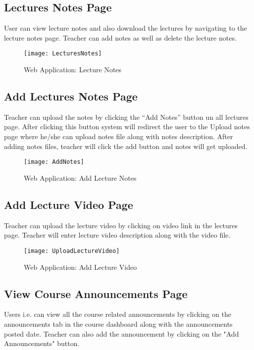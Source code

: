 \subsection{Lectures Notes Page}
User can view lecture notes and also download the lectures by navigating to the lecture notes page. Teacher can add notes as well as delete the lecture notes.

\begin{figure}[h]
  \centering
  \texttt{[image: LecturesNotes]}
  \caption{Web Application: Lecture Notes}
\end{figure}

\subsection{Add Lectures Notes Page}
Teacher can upload the notes by clicking the “Add Notes” button un all lectures page.  After clicking this button system will redirect the user to the Upload notes page where he/she can upload notes file along with notes description. After adding notes files,  teacher  will click the add button and notes will get uploaded.

\begin{figure}[h]
  \centering
  \texttt{[image: AddNotes]}
  \caption{Web Application: Add Lecture Notes}
\end{figure}

\subsection{Add Lecture Video Page}
Teacher can upload the lecture video by clicking on video link in the lectures page. Teacher will enter lecture video description along with the video file.

\begin{figure}[h]
  \centering
  \texttt{[image: UploadLectureVideo]}
  \caption{Web Application: Add Lecture Video}
\end{figure}

\subsection{View Course Announcements Page}
Users i.e. can view all the course related announcements by clicking on the announcements tab in the course dashboard along with the announcements posted date.  Teacher can also add the announcement by clicking on the "Add Announcements" button. 


